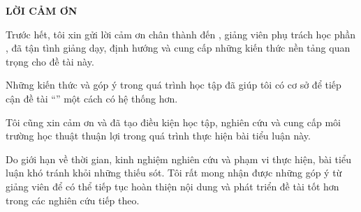 \newpage
\thispagestyle{plain}

\begin{center}
    {\bfseries\Large LỜI CẢM ƠN}
\end{center}

\vspace{1cm}


Trước hết, tôi xin gửi lời cảm ơn chân thành đến \lecturer, giảng viên phụ trách học phần
\coursename, đã tận tình giảng dạy, định hướng và cung cấp những kiến thức nền tảng quan trọng
cho đề tài này.

Những kiến thức và góp ý trong quá trình học tập đã giúp tôi có cơ sở để tiếp cận đề tài
``\projecttitle''
một cách có hệ thống hơn.

Tôi cũng xin cảm ơn \university{} và \faculty{} đã tạo điều kiện học tập, nghiên cứu và cung cấp
môi trường học thuật thuận lợi trong quá trình thực hiện bài tiểu luận này.

Do giới hạn về thời gian, kinh nghiệm nghiên cứu và phạm vi thực hiện, bài tiểu luận khó tránh
khỏi những thiếu sót. Tôi rất mong nhận được những góp ý từ giảng viên để có thể tiếp tục hoàn
thiện nội dung và phát triển đề tài tốt hơn trong các nghiên cứu tiếp theo.
